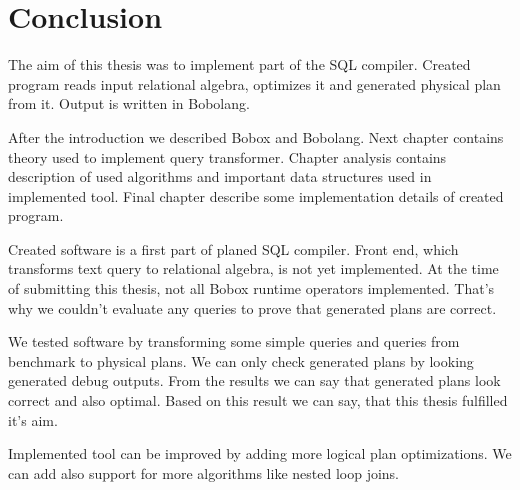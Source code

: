 \chapter{Conclusion}

The aim of this thesis was to implement part of the SQL compiler. Created program reads input relational algebra, optimizes it and generated physical plan from it. Output is written in Bobolang.

After the introduction we described Bobox and Bobolang. Next chapter contains theory used to implement query transformer. Chapter analysis contains description of used algorithms and important data structures used in implemented tool. Final chapter describe some implementation details of created program.

Created software is a first part of planed SQL compiler. Front end, which transforms text query to relational algebra, is not yet implemented. At the time of submitting this thesis, not all Bobox runtime operators implemented. That's why we couldn't evaluate any queries to prove that generated plans are correct.

We tested software by transforming some simple queries and queries from benchmark\cite{benchmark} to physical plans. We can only check generated plans by looking generated debug outputs. From the results we can say that generated plans look correct and also optimal. Based on this result we can say, that this thesis fulfilled it's aim. 


Implemented tool can be improved by adding more logical plan optimizations. We can add also support for more algorithms like nested loop joins.


